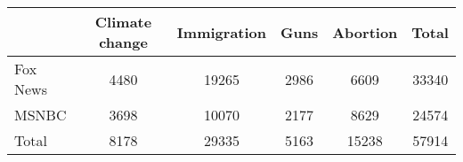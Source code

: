 {
	\def\sym#1{\ifmmode^{#1}\else\(^{#1}\)\fi}
	\begin{tabular}{lccccc}
		\toprule
		& Climate change & Immigration & Guns & Abortion & Total \\ \hline
		Fox News & 4480           & 19265       & 2986 & 6609     & 33340 \\
		MSNBC    & 3698           & 10070       & 2177 & 8629     & 24574 \\
		Total    & 8178           & 29335       & 5163 & 15238    & 57914 \\
		\bottomrule
	\end{tabular}
}